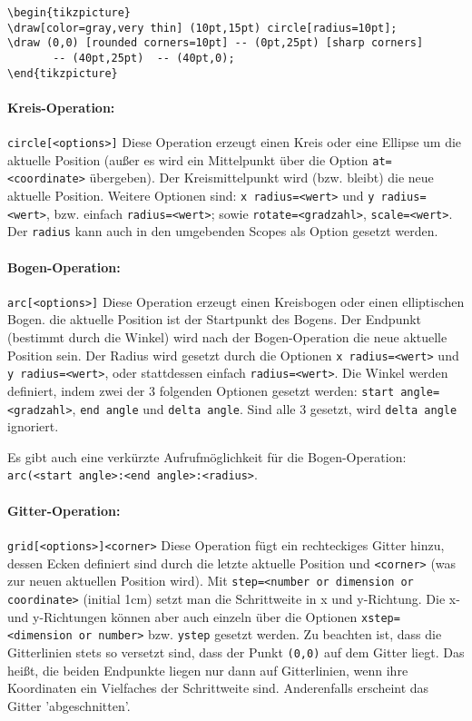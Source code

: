 \documentclass[a4paper,ngerman,10pt]{scrartcl}
\begin{document}
\begin{verbatim}
\begin{tikzpicture}
\draw[color=gray,very thin] (10pt,15pt) circle[radius=10pt];
\draw (0,0) [rounded corners=10pt] -- (0pt,25pt) [sharp corners]
       -- (40pt,25pt)  -- (40pt,0);
\end{tikzpicture}
\end{verbatim}

\paragraph*{Kreis-Operation:} \verb!circle[<options>]! Diese Operation erzeugt einen Kreis oder eine Ellipse um die aktuelle Position (außer es wird ein Mittelpunkt über die Option \verb!at=<coordinate>! übergeben). Der Kreismittelpunkt wird (bzw. bleibt) die neue aktuelle Position. Weitere Optionen sind: \verb!x radius=<wert>! und \verb!y radius=<wert>!, bzw. einfach \verb!radius=<wert>!; sowie \verb!rotate=<gradzahl>!, \verb!scale=<wert>!. Der \verb!radius! kann auch in den umgebenden Scopes als Option gesetzt werden.

\paragraph*{Bogen-Operation:} \verb!arc[<options>]! Diese Operation erzeugt einen Kreisbogen oder einen elliptischen Bogen. die aktuelle Position ist der Startpunkt des Bogens. Der Endpunkt (bestimmt durch die Winkel) wird nach der Bogen-Operation die neue aktuelle Position sein. Der Radius wird gesetzt durch die Optionen \verb!x radius=<wert>! und \verb!y radius=<wert>!, oder stattdessen einfach \verb!radius=<wert>!. Die Winkel werden definiert, indem zwei der 3 folgenden Optionen gesetzt werden: \verb!start angle=<gradzahl>!, \verb!end angle! und \verb!delta angle!. Sind alle 3 gesetzt, wird \verb!delta angle! ignoriert. 

Es gibt auch eine verkürzte Aufrufmöglichkeit für die Bogen-Operation: \texttt{arc(<start angle>:<end angle>:<radius>}.

\paragraph*{Gitter-Operation:} \verb!grid[<options>]<corner>! Diese Operation fügt ein rechteckiges Gitter hinzu, dessen Ecken definiert sind durch die letzte aktuelle Position und \verb!<corner>! (was zur neuen aktuellen Position wird).  Mit \texttt{step=<number or dimension or coordinate>} (initial 1cm) setzt man die Schrittweite in x und y-Richtung. Die x- und y-Richtungen können aber auch einzeln über die Optionen \texttt{xstep=<dimension or number>} bzw. \verb!ystep! gesetzt werden. Zu beachten ist, dass die Gitterlinien stets so versetzt sind, dass der Punkt \verb!(0,0)! auf dem Gitter liegt. Das heißt, die beiden Endpunkte liegen nur dann auf Gitterlinien, wenn ihre Koordinaten ein Vielfaches der Schrittweite sind. Anderenfalls erscheint das Gitter 'abgeschnitten'.
\end{document}
